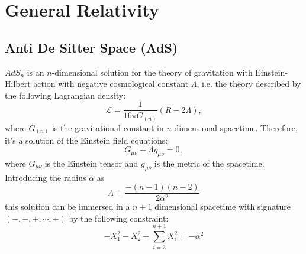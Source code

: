 \chapter{General Relativity}

\section{Anti De Sitter Space (AdS)}
$AdS_n$ is an $n$-dimensional solution for the theory of gravitation with Einstein-Hilbert action with negative cosmological constant $\Lambda$, i.e. the theory described by the following Lagrangian density:
\begin{equation}
\mathcal{L} = \frac{1}{16\pi G_{(n)}}(R-2\Lambda),
\end{equation}
where $G_{(n)}$ is the gravitational constant in $n$-dimensional spacetime. Therefore, it's a solution of the Einstein field equations:
\begin{equation}
G_{\mu\nu} + \Lambda g_{\mu\nu} = 0,
\end{equation}
where $G_{\mu\nu}$ is the Einstein tensor and $g_{\mu\nu}$ is the metric of the spacetime. Introducing the radius $\alpha$ as 
\begin{equation}
\Lambda = \frac{-(n-1)(n-2)}{2\alpha^2}
\end{equation}
this solution can be immersed in a $n+1$ dimensional spacetime with signature $(-,-,+,\cdots,+)$ by the following constraint:
\begin{equation}
-X^2_1 - X^2_2 + \sum_{i=3}^{n+1}X_i^2 = -\alpha^2
\end{equation}
